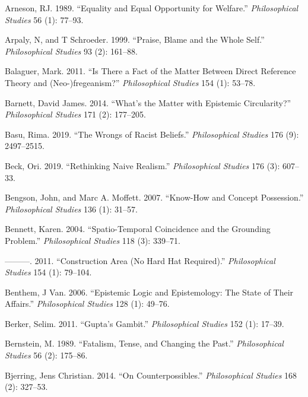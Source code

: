 \documentclass[
  10pt,
  letterpaper,
  DIV=11,
  numbers=noendperiod,
  twoside]{scrartcl}
\newlength{\cslhangindent}
\newenvironment{CSLReferences}[2] %
 {\begin{list}{}{%
  \setlength{\itemindent}{0pt}
  \setlength{\leftmargin}{0pt}
  \setlength{\parsep}{0pt}
  \ifodd #1
   \setlength{\leftmargin}{\cslhangindent}
   \setlength{\itemindent}{-1\cslhangindent}
  \fi
  \setlength{\itemsep}{#2\baselineskip}}}
 {\end{list}}
\begin{document}
\label{refs}
\begin{CSLReferences}{1}{0}
Arneson, RJ. 1989. {``Equality and Equal Opportunity for Welfare.''}
\emph{Philosophical Studies} 56 (1): 77--93.

Arpaly, N, and T Schroeder. 1999. {``Praise, Blame and the Whole
Self.''} \emph{Philosophical Studies} 93 (2): 161--88.

Balaguer, Mark. 2011. {``Is There a Fact of the Matter Between Direct
Reference Theory and (Neo-)fregeanism?''} \emph{Philosophical Studies}
154 (1): 53--78.

Barnett, David James. 2014. {``What's the Matter with Epistemic
Circularity?''} \emph{Philosophical Studies} 171 (2): 177--205.

Basu, Rima. 2019. {``The Wrongs of Racist Beliefs.''}
\emph{Philosophical Studies} 176 (9): 2497--2515.

Beck, Ori. 2019. {``Rethinking Naive Realism.''} \emph{Philosophical
Studies} 176 (3): 607--33.

Bengson, John, and Marc A. Moffett. 2007. {``Know-How and Concept
Possession.''} \emph{Philosophical Studies} 136 (1): 31--57.

Bennett, Karen. 2004. {``Spatio-Temporal Coincidence and the Grounding
Problem.''} \emph{Philosophical Studies} 118 (3): 339--71.

---------. 2011. {``Construction Area (No Hard Hat Required).''}
\emph{Philosophical Studies} 154 (1): 79--104.

Benthem, J Van. 2006. {``Epistemic Logic and Epistemology: The State of
Their Affairs.''} \emph{Philosophical Studies} 128 (1): 49--76.

Berker, Selim. 2011. {``Gupta's Gambit.''} \emph{Philosophical Studies}
152 (1): 17--39.

Bernstein, M. 1989. {``Fatalism, Tense, and Changing the Past.''}
\emph{Philosophical Studies} 56 (2): 175--86.

Bjerring, Jens Christian. 2014. {``On Counterpossibles.''}
\emph{Philosophical Studies} 168 (2): 327--53.


\end{CSLReferences}
\end{document}
